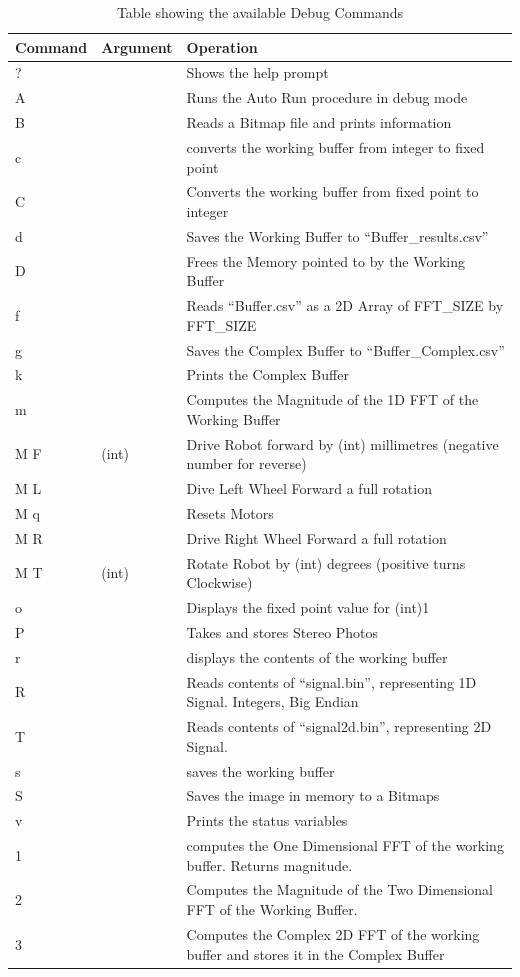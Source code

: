 \begin{table}
\centering
\caption{Table showing the available Debug Commands}
\label{table:Debug}
\begin{tabular}{llp{10cm}}\toprule
Command & Argument & Operation \\\toprule
? && Shows the help prompt\\ \midrule
A && Runs the Auto Run procedure in debug mode\\ \midrule
B && Reads a Bitmap file and prints information \\ \midrule
c && converts the working buffer from integer to fixed point\\\midrule
C && Converts the working buffer from fixed point to integer\\\midrule
d && Saves the Working Buffer to ``Buffer\_results.csv'' \\ \midrule
D && Frees the Memory pointed to by the Working Buffer \\ \midrule
f && Reads ``Buffer.csv'' as a 2D Array of FFT\_SIZE by FFT\_SIZE\\ \midrule
g && Saves the Complex Buffer to ``Buffer\_Complex.csv'' \\\midrule
k && Prints the Complex Buffer \\ \midrule
m && Computes the Magnitude of the 1D FFT of the Working Buffer \\\midrule
M F &(int) & Drive Robot forward by (int) millimetres (negative number for reverse)\\\midrule
M L && Dive Left Wheel Forward a full rotation \\\midrule
M q && Resets Motors \\\midrule
M R && Drive Right Wheel Forward a full rotation \\\midrule
M T &(int) & Rotate Robot by (int) degrees (positive turns Clockwise)\\\midrule
o && Displays the fixed point value for (int)1 \\\midrule
P && Takes and stores Stereo Photos \\ \midrule
r && displays the contents of the working buffer\\\midrule
R && Reads contents of ``signal.bin'', representing 1D Signal. Integers, Big Endian\\\midrule
T && Reads contents of ``signal2d.bin'', representing 2D Signal. \\ \midrule
s && saves the working buffer\\\midrule
S && Saves the image in memory to a Bitmaps \\\midrule
v && Prints the status variables \\ \midrule
1 && computes the One Dimensional FFT of the working buffer. Returns magnitude.\\\midrule
2 && Computes the Magnitude of the Two Dimensional FFT of the Working Buffer. \\ \midrule
3 && Computes the Complex 2D FFT of the working buffer and stores it in the Complex Buffer \\ \bottomrule
\end{tabular}
\end{table}

